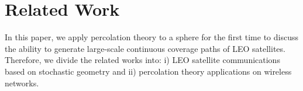 \section{Related Work}
In this paper, we apply percolation theory to a sphere for the first time to discuss the ability to generate large-scale continuous coverage paths of LEO satellites. Therefore, we divide the related works into: i) LEO satellite communications based on stochastic geometry and ii) percolation theory applications on wireless networks.\\%
